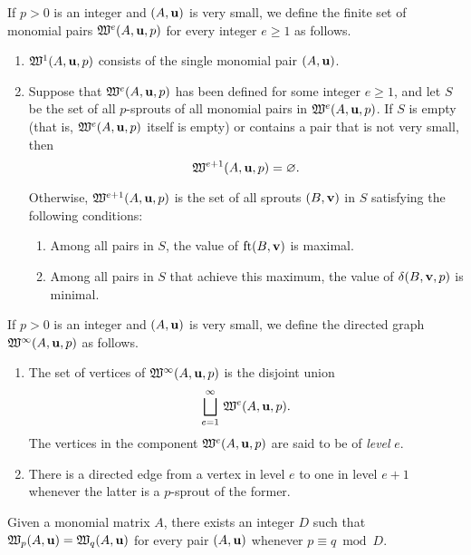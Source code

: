 \documentclass[11pt]{amsart}
\renewcommand{\!}[1]{{\color{red}\text{$\star$\,}#1\,$\star$}}
\begin{document}
\begin{definition}  If $p>0$ is an integer and $(A, \mathbf{u})$ is very small, we define the finite set of monomial pairs $\mathfrak{W}^e(A, \mathbf{u}, p)$ for every integer $e \geq 1$ as follows.

\begin{enumerate}
\item $\mathfrak{W}^1(A, \mathbf{u}, p)$ consists of the single monomial pair $(A, \mathbf{u})$.
\item Suppose that $\mathfrak{W}^e(A, \mathbf{u}, p)$ has been defined for some integer $e \geq 1$, and let $S$ be the set of all $p$-sprouts of all monomial pairs in $\mathfrak{W}^e(A, \mathbf{u}, p)$.  If  $S$ is empty (that is, $\mathfrak{W}^e(A, \mathbf{u}, p)$ itself is empty) or contains a pair that is not very small, then \[ \mathfrak{W}^{e+1}(A, \mathbf{u}, p) = \varnothing.\]  

Otherwise, $\mathfrak{W}^{e+1}(A, \mathbf{u}, p)$ is the set of all sprouts $(B, \mathbf{v})$ in $S$ satisfying the following conditions:    

\begin{enumerate}
\item Among all pairs in $S$, the value of  $\operatorname{ft}(B, \mathbf{v})$ is maximal.
\item Among all pairs in $S$ that achieve this maximum, the value of $\delta(B, \mathbf{v}, p)$ is minimal.
\end{enumerate}
\end{enumerate}
\end{definition}

\begin{definition}
If $p > 0$ is an integer and $(A, \mathbf{u})$ is very small, we define the directed graph $\mathfrak{W}^{\infty}(A, \mathbf{u}, p)$ as follows.
\begin{enumerate}
\item  The set of vertices of $\mathfrak{W}^{\infty}(A, \mathbf{u}, p)$ is the disjoint union \[ \bigsqcup_{e=1}^{\infty} \, \mathfrak{W}^e(A, \mathbf{u}, p).\]
The vertices in the component $\mathfrak{W}^e(A, \mathbf{u}, p)$ are said to be of \emph{level} $e$.  
\item  There is a directed edge from a vertex in level $e$ to one in level $e+1$ whenever the latter is a $p$-sprout of the former.
\end{enumerate}
\end{definition}


\begin{proposition}
Given a monomial matrix $A$, there exists an integer $D$ such that $\mathfrak{W}_p(A, \mathbf{u}) = \mathfrak{W}_q(A, \mathbf{u})$ for every pair $(A, \mathbf{u})$ whenever $p \equiv q \bmod D$.
\end{proposition}
\end{document}
